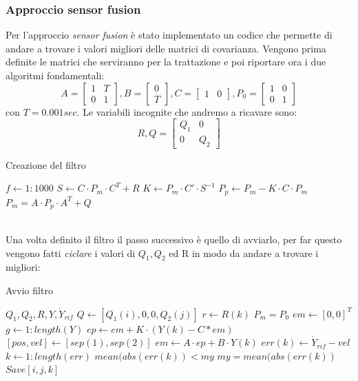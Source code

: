\subsubsection*{Approccio sensor fusion}
Per l'approccio \textit{sensor fusion} è stato implementato un codice che permette di andare a trovare i valori migliori delle matrici di covarianza. Vengono prima definite le matrici che serviranno per la trattazione e poi riportare ora i due algoritmi fondamentali:
\begin{equation}
A = \begin{bmatrix}
1 & T \\ 0 & 1
\end{bmatrix}, B = \begin{bmatrix}
0 \\ T
\end{bmatrix}, C=\begin{bmatrix}
 1 & 0
\end{bmatrix}, P_0 = \begin{bmatrix}
1 & 0 \\ 0 & 1
\end{bmatrix}
\end{equation}
con $T = 0.001 sec$.  Le variabili incognite che andremo a ricavare sono:
\begin{equation}
R , Q = \begin{bmatrix}
Q_1 & 0 \\ 0 & Q_2
\end{bmatrix}
\end{equation}
\begin{algorithm}
\caption{Creazione del filtro}\label{alg:cap}
\begin{algorithmic}
\For $f \gets 1 : 1000$ 
\State $S \gets C\cdot P_m \cdot C^T + R$
\State $K \gets P_m \cdot C'\cdot S^{-1}$
\State $P_p \gets P_m - K\cdot C\cdot P_m$
\State $P_m = A\cdot P_p\cdot A^T + Q$
\EndFor
\end{algorithmic}
\end{algorithm}
\\Una volta definito il filtro il passo successivo è quello di avviarlo, per far questo vengono fatti \textit{ciclare} i valori di $Q_1,Q_2$ ed R in modo da andare a trovare i migliori: 
\begin{algorithm}
\caption{Avvio filtro}\label{alg:avvio}
\begin{algorithmic}
\Require $Q_1, Q_2, R,Y,\dot{Y}_{rif}$
\State $Q \gets [Q_1(i),0,0,Q_2(j)]$
\State $r \gets R(k)$
\State $P_m = P_0$
\State $em \gets [0,0]^T$
\For $ g \gets 1 : length(Y)$
\State $ ep \gets em + K\cdot (Y(k)-C*em)$
\State $ [pos,vel] \gets [sep(1),sep(2)]$
 \State $em \gets A\cdot ep + B\cdot Y(k)$
 \State $err(k) \gets \dot{Y}_{rif} - vel$
\EndFor
\For $k \gets 1:length(err)$
\If $mean(abs(err(k)) < my$
\State $my = mean(abs(err(k))$
\State $ Save [i,j,k]$
\EndIf
\EndFor
\EndFor
\EndFor
\EndFor
\end{algorithmic}
\end{algorithm}
